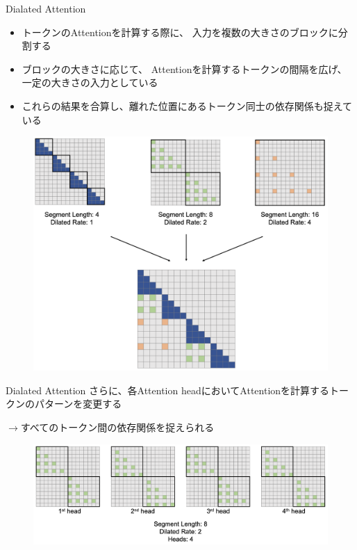 \documentclass[dvipdfm, aspectratio=169]{beamer}
\begin{document}
    \begin{frame}{Dialated Attention}
        \begin{itemize}
            \item{
                トークンのAttentionを計算する際に、
                入力を複数の大きさのブロックに分割する
            }
            \item{
                ブロックの大きさに応じて、
                Attentionを計算するトークンの間隔を広げ、
                一定の大きさの入力としている
            }
            \item{
                これらの結果を合算し、離れた位置にあるトークン同士の依存関係も捉えている
            }
        \end{itemize}
        \begin{figure}[ht]
            \centering
            \includegraphics[width=.4\hsize]{dialated.png}
        \end{figure}
    \end{frame}
    \begin{frame}{Dialated Attention}
        さらに、各Attention headにおいてAttentionを計算するトークンのパターンを変更する

        $\rightarrow$すべてのトークン間の依存関係を捉えられる
        \begin{figure}[ht]
            \centering
            \includegraphics[width=.9\hsize]{dialated_pattern.png}
        \end{figure}
    \end{frame}
\end{document}

